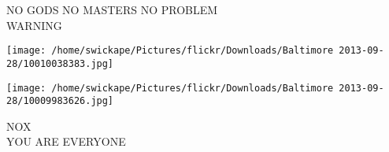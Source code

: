 \documentclass[10pt,letterpaper]{article}
\begin{document}
NO GODS NO MASTERS NO PROBLEM\\
WARNING\\
\pagebreak

\texttt{[image: /home/swickape/Pictures/flickr/Downloads/Baltimore 2013-09-28/10010038383.jpg]}

\vspace{0.25in}
\texttt{[image: /home/swickape/Pictures/flickr/Downloads/Baltimore 2013-09-28/10009983626.jpg]}

NOX\\
YOU ARE EVERYONE\\
\pagebreak
\end{document}
